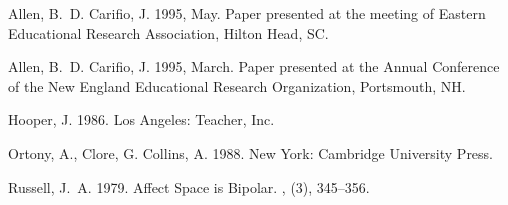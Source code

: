 ﻿\documentclass[11pt]{article}
\begin{document}
\citep{hooper1986,ortony1988,russell1979} 
\citet{allen1995a}
\citet[in][chap.~3]{allen1995a}
\citeauthor{allen1995b}
\citeyear{allen1995b}
\citeyearpar{allen1995b}

%

\begin{thebibliography}{}

Allen, B.~D.\BCBT{} \BBA{} Carifio, J.
\newblock{}\BBOP{}1995\protect{}, May\BBCP{}.
\newblock{}
\newblock{}Paper presented at the meeting of Eastern Educational Research
  Association, Hilton Head, SC.

Allen, B.~D.\BCBT{} \BBA{} Carifio, J.
\newblock{}\BBOP{}1995\protect{}, March\BBCP{}.
\newblock{}
\newblock{}Paper presented at the Annual Conference of the New England
  Educational Research Organization, Portsmouth, NH.

Hooper, J.
\newblock{}\BBOP{}1986\BBCP{}.
\newblock{}
\newblock{}Los Angeles: Teacher, Inc.

Ortony, A., Clore, G.\BCBL{} \BBA{} Collins, A.
\newblock{}\BBOP{}1988\BBCP{}.
\newblock{}
\newblock{}New York: Cambridge University Press.

Russell, J.~A.
\newblock{}\BBOP{}1979\BBCP{}.
\newblock{}\BBOQ{}Affect {S}pace is {B}ipolar.\BBCQ{}
\newblock{}, (3),
  345--356.

\end{thebibliography}
\end{document}
